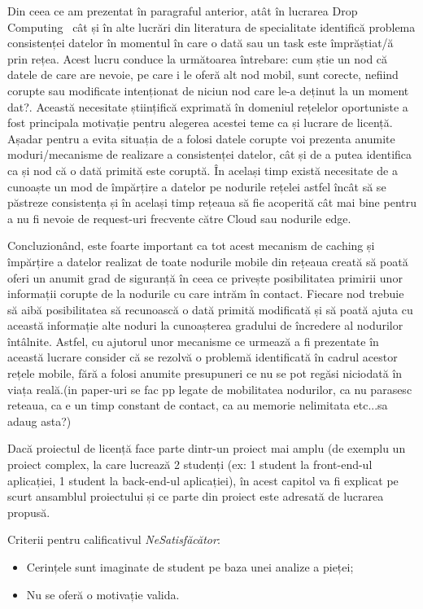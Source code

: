 \documentclass[12pt,a4paper]{report}
\newcommand{\worktype}[1]{[\textit{#1}] }
\newcommand{\dezvoltare}{\worktype{Dezvoltare de produs}}
\newcommand{\cercetare}{\worktype{Cercetare}}
\begin{document}
Din ceea ce am prezentat în paragraful anterior, atât în lucrarea Drop Computing~\cite{DC} cât și în alte lucrări din literatura de specialitate identifică problema consistenței datelor în momentul în care o dată sau un task este împrăștiat/ă prin rețea. Acest lucru conduce la următoarea întrebare: cum știe un nod că datele de care are nevoie, pe care i le oferă alt nod mobil, sunt corecte, nefiind corupte sau modificate intenționat de niciun nod care le-a deținut la un moment dat?. Această necesitate științifică exprimată în domeniul rețelelor oportuniste a fost principala motivație pentru alegerea acestei teme ca și lucrare de licență. Așadar pentru a evita situația de a folosi datele corupte voi prezenta anumite moduri/mecanisme de realizare a consistenței datelor, cât și de a putea identifica ca și nod că o dată primită este coruptă. În același timp există necesitate de a cunoaște un mod de împărțire a datelor pe nodurile rețelei astfel încât să se păstreze consistența și în același timp rețeaua să fie acoperită cât mai bine pentru a nu fi nevoie de request-uri frecvente către Cloud sau nodurile edge.

Concluzionând, este foarte important ca tot acest mecanism de caching și împărțire a datelor realizat de toate nodurile mobile din rețeaua creată să poată oferi un anumit grad de siguranță în ceea ce privește posibilitatea primirii unor informații corupte de la nodurile cu care intrăm în contact. Fiecare nod trebuie să aibă posibilitatea să recunoască o dată primită modificată și să poată ajuta cu această informație alte noduri la cunoașterea gradului de încredere al nodurilor întâlnite. Astfel, cu ajutorul unor mecanisme ce urmează a fi prezentate în această lucrare consider că se rezolvă o problemă identificată în cadrul acestor rețele mobile, fără a folosi anumite presupuneri ce nu se pot regăsi niciodată în viața reală.(in paper-uri se fac pp legate de mobilitatea nodurilor, ca nu parasesc reteaua, ca e un timp constant de contact, ca au memorie nelimitata etc...sa adaug asta?)

Dacă proiectul de licență face parte dintr-un proiect mai amplu (de exemplu un proiect complex, la care lucrează 2 studenți (ex: 1 student la front-end-ul aplicației, 1 student la back-end-ul aplicației), în acest capitol va fi explicat pe scurt ansamblul proiectului și ce parte din proiect este adresată de lucrarea propusă. 

Criterii pentru calificativul \textit{Ne\textit{Satisfăcător}}: 
\begin{itemize}
	\item \dezvoltare Cerințele sunt imaginate de student pe baza unei analize a pieței;
	\item \cercetare Nu se oferă o motivație valida.
\end{itemize}
\end{document}
